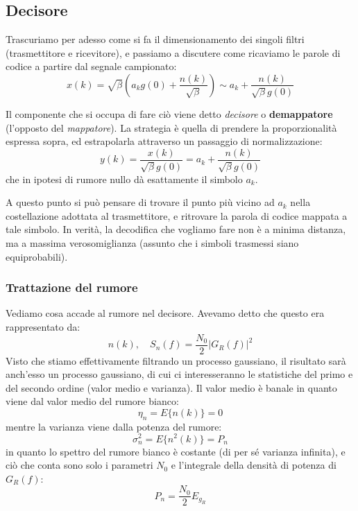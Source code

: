 \documentclass[a4paper,11pt]{article}
\begin{document}
\subsection{Decisore}
Trascuriamo per adesso come si fa il dimensionamento dei singoli filtri (trasmettitore e ricevitore), e passiamo a discutere come ricaviamo le parole di codice a partire dal segnale campionato:
$$
x(k) = \sqrt{\beta} \left( a_k g(0) + \frac{n(k)}{\sqrt{\beta}} \right) \sim a_k + \frac{n(k)}{\sqrt{\beta} g(0)}
$$

Il componente che si occupa di fare ciò viene detto \textit{decisore} o \textbf{demappatore} (l'opposto del \textit{mappatore}). La strategia è quella di prendere la proporzionalità espressa sopra, ed estrapolarla attraverso un passaggio di normalizzazione:
$$
y(k) = \frac{x(k)}{\sqrt{\beta} g(0)} = a_k + \frac{n(k)}{\sqrt{\beta} g(0)}
$$
che in ipotesi di rumore nullo dà esattamente il simbolo $a_k$.

A questo punto si può pensare di trovare il punto più vicino ad $a_k$ nella costellazione adottata al trasmettitore, e ritrovare la parola di codice mappata a tale simbolo. In verità, la decodifica che vogliamo fare non è a minima distanza, ma a massima verosomiglianza (assunto che i simboli trasmessi siano equiprobabili).

\subsubsection{Trattazione del rumore}
Vediamo cosa accade al rumore nel decisore. Avevamo detto che questo era rappresentato da:
$$
n(k), \quad S_n(f) = \frac{N_0}{2} | G_R(f) |^2
$$
Visto che stiamo effettivamente filtrando un processo gaussiano, il risultato sarà anch'esso un processo gaussiano, di cui ci interesseranno le statistiche del primo e del secondo ordine (valor medio e varianza).
Il valor medio è banale in quanto viene dal valor medio del rumore bianco:
$$
\eta_n = E \{ n(k) \} = 0
$$
mentre la varianza viene dalla potenza del rumore:
$$
\sigma_n^2 = E \{ n^2(k) \} = P_n
$$
in quanto lo spettro del rumore bianco è costante (di per sé varianza infinita), e ciò che conta sono solo i parametri $N_0$ e l'integrale della densità di potenza di $G_R(f)$:
$$
P_n = \frac{N_0}{2} E_{g_R}
$$
\end{document}
